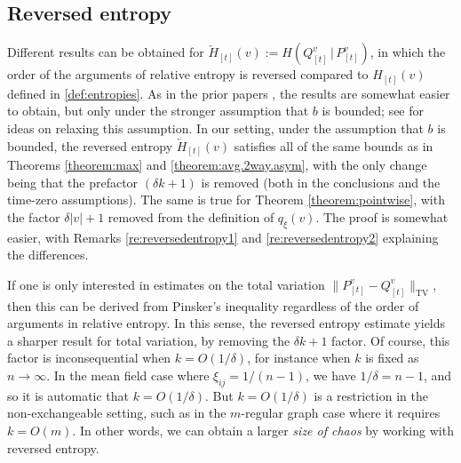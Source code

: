 \documentclass[11pt,reqno]{amsart}
\numberwithin{equation}{section}
\theoremstyle{definition}
\begin{document}
\subsection{Reversed entropy} \label{se:reversedentropy}

Different results can be obtained for $\overleftarrow{H}_{[t]}(v) := H(Q^v_{[t]}\,|\,P^v_{[t]})$, in which the order of the arguments of relative entropy is reversed compared to $H_{[t]}(v)$ defined in \eqref{def:entropies}.
As in the prior papers \cite{lacker2022hierarchies,lacker2023sharp}, the results are somewhat easier to obtain, but only under the stronger assumption that $b$ is bounded; see \cite[Remark 4.12]{lacker2022hierarchies} for ideas on relaxing this assumption.
In our setting, under the assumption that $b$ is bounded, the reversed entropy $\overleftarrow{H}_{[t]}(v)$ satisfies all of the same bounds as in Theorems  \ref{theorem:max} and  \ref{theorem:avg.2way.asym}, with the only change being that the prefactor $(\delta k+1)$ is removed (both in the conclusions and the time-zero assumptions). The same is true for Theorem \ref{theorem:pointwise}, with the factor $\delta|v|+1$ removed from the definition of $q_\xi(v)$.
The proof is somewhat easier, with Remarks \ref{re:reversedentropy1} and \ref{re:reversedentropy2} explaining the differences.

If one is only interested in estimates on the total variation $\|P^v_{[t]} - Q^v_{[t]}\|_{\mathrm{TV}}$, then this can be derived from Pinsker's inequality regardless of the order of arguments in relative entropy. In this sense, the reversed entropy estimate yields a sharper result for total variation, by removing the $\delta k + 1$ factor. Of course, this factor is inconsequential when $k=O(1/\delta)$, for instance when $k$ is fixed as $n\to\infty$. In the mean field case where $\xi_{ij}=1/(n-1)$, we have $1/\delta=n-1$, and so it is automatic that $k=O(1/\delta)$. But $k=O(1/\delta)$ is a restriction in the non-exchangeable setting, such as in the $m$-regular graph case where it requires $k = O(m)$. In other words, we can obtain a larger \emph{size of chaos} by working with reversed entropy.
\end{document}
